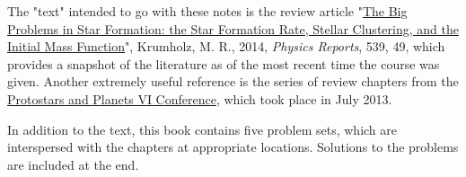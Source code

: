 \documentclass{tex/tufte-book} %
\begin{document}
The "text" intended to go with these notes is the review article "\href{http://adsabs.harvard.edu/abs/2014arXiv1402.0867K}{The Big Problems in Star Formation: the Star Formation Rate, Stellar Clustering, and the Initial Mass Function}", Krumholz, M. R., 2014, \textit{Physics Reports}, 539, 49, which provides a snapshot of the literature as of the most recent time the course was given. Another extremely useful reference is the series of review chapters from the \href{http://www.mpia.de/homes/ppvi/}{Protostars and Planets VI Conference}, which took place in July 2013.

In addition to the text, this book contains five problem sets, which are interspersed with the chapters at appropriate locations. Solutions to the problems are included at the end.











\end{document}
